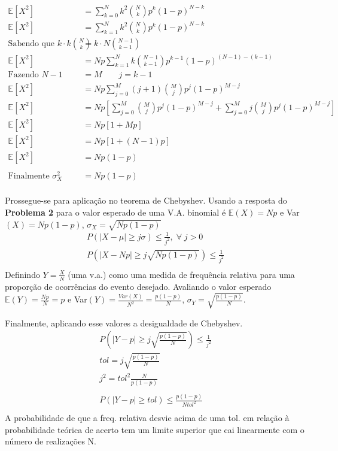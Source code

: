 \documentclass{article}
\begin{document}
\begin{align*}
    \mathbb{E}[X^2] &= \sum_{k=0}^{N} k^2 {N \choose k} p^{k} (1-p)^{N-k} \\
    \mathbb{E}[X^2] &= \sum_{k=1}^{N} k^2 {N \choose k} p^{k} (1-p)^{N-k} \\
    \text{Sabendo que } k \cdot k {N \choose k} &= k \cdot N {N-1 \choose k-1} \\
    \mathbb{E}[X^2] &= Np \sum_{k=1}^{N} k {N-1 \choose k-1} p^{k-1} (1-p)^{(N-1)-(k-1)} \\
    \text{Fazendo } N - 1 &= M \qquad j = k - 1\\
    \mathbb{E}[X^2] &= Np \sum_{j=0}^{M} (j+1) {M \choose j} p^{j} (1-p)^{M-j} \\
    \mathbb{E}[X^2] &= Np \left[ \sum_{j=0}^{M} {M \choose j} p^{j} (1-p)^{M-j} + \sum_{j=0}^{M} j {M
    \choose j} p^{j} (1-p)^{M-j}\right] \\
    \mathbb{E}[X^2] &= Np [1 + Mp] \\
    \mathbb{E}[X^2] &= Np [1 + (N-1)p] \\
    \mathbb{E}[X^2] &= Np(1-p) \\[-1.0em] \\
    \text{Finalmente } \sigma^2_X &= Np(1-p) \\[-2.0em]
\end{align*}

Prossegue-se para aplicação no teorema de Chebyshev. Usando a resposta do \textbf{Problema 2} para
o valor esperado de uma V.A. binomial é $\mathbb{E}(X) = Np$
e Var$(X) = Np(1-p)$, $\sigma_X = \sqrt{Np(1-p)}$
\begin{align*}
P(|X - \mu| \geq j \sigma) \leq \frac{1}{j^2}, \; \forall \; j > 0 \\
P(|X - Np| \geq j \sqrt{Np(1-p)}) \leq \frac{1}{j^2} \\[-1em]
\end{align*}
Definindo $Y = \frac{X}{N}$ (uma v.a.) como uma medida de frequência relativa para uma proporção de
ocorrências do evento desejado.
Avaliando o valor esperado $\mathbb{E}(Y) = \frac{Np}{N} = p$ e Var$(Y) = \frac{Var(X)}{N^2} = \frac{p(1-p)}{N}$, $\sigma_Y = \sqrt{\frac{p(1-p)}{N}}$.

Finalmente, aplicando esse valores a desigualdade de Chebyshev.
\begin{align*}
    P(|Y - p| \geq j \sqrt{\frac{p(1-p)}{N}}) \leq \frac{1}{j^2} \\
    tol = j \sqrt{\frac{p(1-p)}{N}} \\
    j^2 = tol^2 \frac{N}{p(1-p)} \\
    \\
    P(|Y - p| \geq tol) \leq \frac{p(1-p)}{N tol^2} \\[-1em]
\end{align*}
A probabilidade de que a freq. relativa desvie acima de uma tol. em relação à probabilidade teórica
de acerto tem um limite superior que cai linearmente com o número de realizações N.
\end{document}
